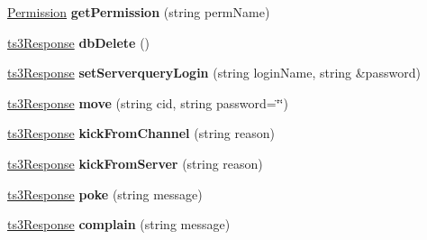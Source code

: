 \begin{DoxyCompactItemize}
\item 
\hyperlink{class_ts3_api_1_1_permission}{Permission} {\bfseries get\+Permission} (string perm\+Name)\hypertarget{class_ts3_api_1_1_client_a707da8b57b1d8cea387d740507878170}{}\label{class_ts3_api_1_1_client_a707da8b57b1d8cea387d740507878170}

\item 
\hyperlink{struct_ts3_api_1_1ts3_response}{ts3\+Response} {\bfseries db\+Delete} ()\hypertarget{class_ts3_api_1_1_client_a121f505bf3d9b852c22ee668d6734b3a}{}\label{class_ts3_api_1_1_client_a121f505bf3d9b852c22ee668d6734b3a}

\item 
\hyperlink{struct_ts3_api_1_1ts3_response}{ts3\+Response} {\bfseries set\+Serverquery\+Login} (string login\+Name, string \&password)\hypertarget{class_ts3_api_1_1_client_a277e3458db8f632503f42b3d11d7bf28}{}\label{class_ts3_api_1_1_client_a277e3458db8f632503f42b3d11d7bf28}

\item 
\hyperlink{struct_ts3_api_1_1ts3_response}{ts3\+Response} {\bfseries move} (string cid, string password=\char`\"{}\char`\"{})\hypertarget{class_ts3_api_1_1_client_a1673758a952af1d35e8e7cd1ee2797e7}{}\label{class_ts3_api_1_1_client_a1673758a952af1d35e8e7cd1ee2797e7}

\item 
\hyperlink{struct_ts3_api_1_1ts3_response}{ts3\+Response} {\bfseries kick\+From\+Channel} (string reason)\hypertarget{class_ts3_api_1_1_client_ab381622a51f6ae97b1e137bf7ac6a409}{}\label{class_ts3_api_1_1_client_ab381622a51f6ae97b1e137bf7ac6a409}

\item 
\hyperlink{struct_ts3_api_1_1ts3_response}{ts3\+Response} {\bfseries kick\+From\+Server} (string reason)\hypertarget{class_ts3_api_1_1_client_a6e8af904443616a105b1175bf75af0ac}{}\label{class_ts3_api_1_1_client_a6e8af904443616a105b1175bf75af0ac}

\item 
\hyperlink{struct_ts3_api_1_1ts3_response}{ts3\+Response} {\bfseries poke} (string message)\hypertarget{class_ts3_api_1_1_client_ace50488f45a5a3c823d81cad5b472c36}{}\label{class_ts3_api_1_1_client_ace50488f45a5a3c823d81cad5b472c36}

\item 
\hyperlink{struct_ts3_api_1_1ts3_response}{ts3\+Response} {\bfseries complain} (string message)\hypertarget{class_ts3_api_1_1_client_aa906a4990ae4782977fe57a2ac769afa}{}\label{class_ts3_api_1_1_client_aa906a4990ae4782977fe57a2ac769afa}


\end{DoxyCompactItemize}
